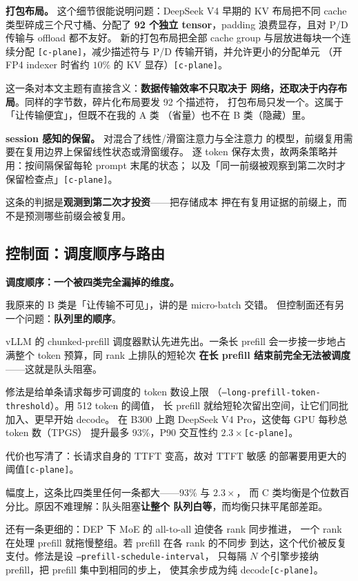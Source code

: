 \noindent\textbf{打包布局。} 这个细节很能说明问题：DeepSeek V4 早期的
KV 布局把不同 cache 类型碎成三个尺寸桶、分配了 \textbf{92 个独立
tensor}，padding 浪费显存，且对 P/D 传输与 offload 都不友好。
新的打包布局把全部 cache group 与层放进每块一个连续分配
\texttt{[c-plane]}，减少描述符与 P/D 传输开销，并允许更小的分配单元
（开 FP4 indexer 时省约 $10\%$ 的 KV 显存）\texttt{[c-plane]}。

\noindent 这一条对本文主题有直接含义：\textbf{数据传输效率不只取决于
网络，还取决于内存布局}。同样的字节数，碎片化布局要发 92 个描述符，
打包布局只发一个。这属于「让传输便宜」，但既不在我的 A 类
（省量）也不在 B 类（隐藏）里。

\noindent\textbf{session 感知的保留。} 对混合了线性/滑窗注意力与全注意力
的模型，前缀复用需要在复用边界上保留线性状态或滑窗缓存。
逐 token 保存太贵，故两条策略并用：按间隔保留每轮 prompt 末尾的状态；
以及「同一前缀被观察到第二次时才保留检查点」\texttt{[c-plane]}。

\noindent 这条的判据是\textbf{观测到第二次才投资}——把存储成本
押在有复用证据的前缀上，而不是预测哪些前缀会被复用。

\subsection{控制面：调度顺序与路由}

\noindent\textbf{调度顺序：一个被四类完全漏掉的维度。}

我原来的 B 类是「让传输不可见」，讲的是 micro-batch 交错。
但控制面还有另一个问题：\textbf{队列里的顺序}。

\noindent vLLM 的 chunked-prefill 调度器默认先进先出。一条长 prefill
会一步接一步地占满整个 token 预算，同 rank 上排队的短轮次
\textbf{在长 prefill 结束前完全无法被调度}——这就是队头阻塞。

\noindent 修法是给单条请求每步可调度的 token 数设上限
（\texttt{--long-prefill-token-threshold}）。用 512 token 的阈值，
长 prefill 就给短轮次留出空间，让它们同批加入、更早开始 decode。
在 B300 上跑 DeepSeek V4 Pro，这使每 GPU 每秒总 token 数（TPGS）
提升最多 $93\%$，P90 交互性约 $2.3\times$\texttt{[c-plane]}。

\noindent 代价也写清了：长请求自身的 TTFT 变高，故对 TTFT 敏感
的部署要用更大的阈值\texttt{[c-plane]}。

\noindent 幅度上，这条比四类里任何一条都大——$93\%$ 与 $2.3\times$，
而 C 类均衡是个位数百分比。原因不难理解：队头阻塞\textbf{让整个
队列白等}，而均衡只抹平尾部差距。

\noindent 还有一条更细的：DEP 下 MoE 的 all-to-all 迫使各 rank 同步推进，
一个 rank 在处理 prefill 就拖慢整组。若 prefill 在各 rank 的不同步
到达，这个代价被反复支付。修法是设 \texttt{--prefill-schedule-interval}，
只每隔 $N$ 个引擎步接纳 prefill，把 prefill 集中到相同的步上，
使其余步成为纯 decode\texttt{[c-plane]}。

